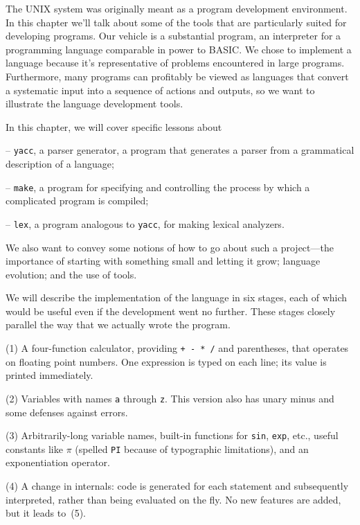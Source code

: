 \noindent
The {\sc UNIX} system was originally meant as a program development
environment. In this chapter we'll talk about some of the tools that
are particularly suited for developing programs. Our vehicle is a
substantial program, an interpreter for a programming language
comparable in power to {\sc BASIC}. We chose to implement a language
because it's representative of problems encountered in large
programs. Furthermore, many programs can profitably be viewed as
languages that convert a systematic input into a sequence of actions
and outputs, so we want to illustrate the language development tools.

In this chapter, we will cover specific lessons about
\item{--} {\tt yacc}, a parser generator, a program that generates
a parser from a grammatical description of a language;
\item{--} {\tt make}, a program for specifying and controlling the
process by which a complicated program is compiled;
\item{--} {\tt lex}, a program analogous to {\tt yacc}, for making
 lexical analyzers.
\par\noindent
We also want to convey some notions of how to go about such a
project---the importance of starting with something small and letting
it grow; language evolution; and the use of tools.

We will describe the implementation of the language in six stages,
each of which would be useful even if the development went no further.
These stages closely parallel the way that we actually wrote the
program.

\smallskip\item{(1)}
A four-function calculator, providing {\tt + - * /} and parentheses,
that operates on floating point numbers. One expression is typed on
each line; its value is printed immediately.

\smallskip\item{(2)}
Variables with names {\tt a} through {\tt z}. This version also has
unary minus and some defenses against errors.

\smallskip\item{(3)}
Arbitrarily-long variable names, built-in functions for {\tt sin},
{\tt exp}, etc., useful constants like $\pi$ (spelled {\tt PI}
because of typographic limitations), and an exponentiation operator.

\smallskip\item{(4)}
A change in internals: code is generated for each statement and
subsequently interpreted, rather than being evaluated on the fly.
No new features are added, but it leads to~(5).

